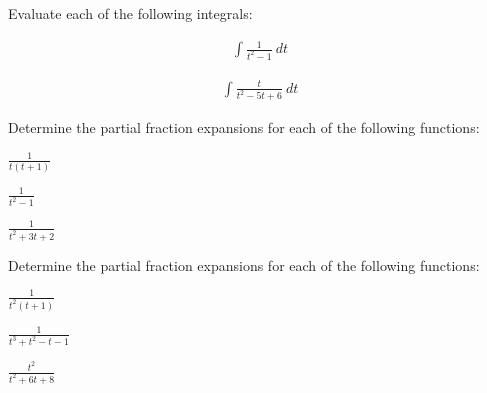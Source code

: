 

\begin{problem}
\item Evaluate each of the following integrals:

  \begin{subproblem}
  \item 
    \begin{eqnarray}
      \int \frac{1}{t^2-1} ~ dt 
    \end{eqnarray}
    \vfill

  \item 
    \begin{eqnarray}
      \int \frac{t}{t^2-5t+6} ~ dt
    \end{eqnarray}
    \vfill

  \end{subproblem}
\end{problem}


\begin{problem}
\item Determine the partial fraction expansions for each of the following functions:

  \begin{subproblem}
  \item $\frac{1}{t(t+1)}$
    \vfill
  \item $\frac{1}{t^2-1}$
    \vfill
  \item $\frac{1}{t^2+3t+2}$
    \vfill
  \end{subproblem}


  \clearpage
\item Determine the partial fraction expansions for each of the following functions:

  \begin{subproblem}
  \item $\frac{1}{t^2(t+1)}$
    \vfill
  \item $\frac{1}{t^3+t^2-t-1}$
    \vfill
  \item $\frac{t^2}{t^2+6t+8}$
    \vfill
  \end{subproblem}


\end{problem}


